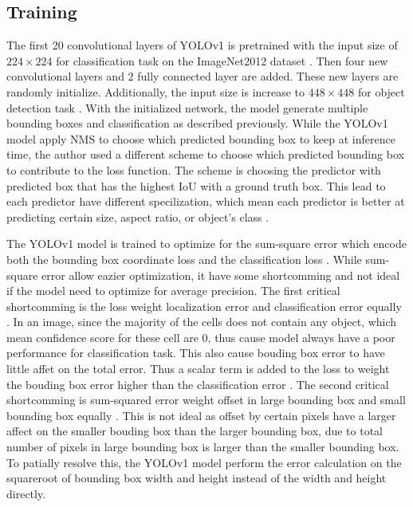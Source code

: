 \subsection{Training}
The first 20 convolutional layers of YOLOv1 is pretrained with the input size of $224 \times 224$ for classification task on the ImageNet2012 dataset \cite{ImageNet_dataset}. Then four new convolutional layers and 2 fully connected layer are added. These new layers are randomly initialize. Additionally, the input size is increase to $448 \times 448$ for object detection task \cite{yolov1_2016}. With the initialized network, the model generate multiple bounding boxes and classification as described previously. While the YOLOv1 model apply NMS to choose which predicted bounding box to keep at inference time, the author used a different scheme to choose which predicted bounding box to contribute to the loss function. The scheme is choosing the predictor with predicted box that has the highest IoU with a ground truth box. This lead to each predictor have different specilization, which mean each predictor is better at predicting certain size, aspect ratio, or object's class \cite{yolov1_2016}.

The YOLOv1 model is trained to optimize for the sum-square error which encode both the bounding box coordinate loss and the classification loss \cite{yolov1_2016}. While sum-square error allow eazier optimization, it have some shortcomming and not ideal if the model need to optimize for average precision. The first critical shortcomming is the loss weight localization error and classification error equally \cite{yolov1_2016}. In an image, since the majority of the cells does not contain any object, which mean confidence score for these cell are 0, thus cause model always have a poor performance for classification task. This also cause bouding box error to have little affet on the total error. Thus a scalar term is added to the loss to weight the bouding box error higher than the classification error \cite{yolov1_2016}. The second critical shortcomming is sum-squared error weight offset in large bounding box and small bounding box equally \cite{yolov1_2016}. This is not ideal as offset by certain pixels have a larger affect on the smaller bouding box than the larger bounding box, due to total number of pixels in large bounding box is larger than the smaller bounding box. To patially resolve this, the YOLOv1 model perform the error calculation on the squareroot of bounding box width and height instead of the width and height directly.